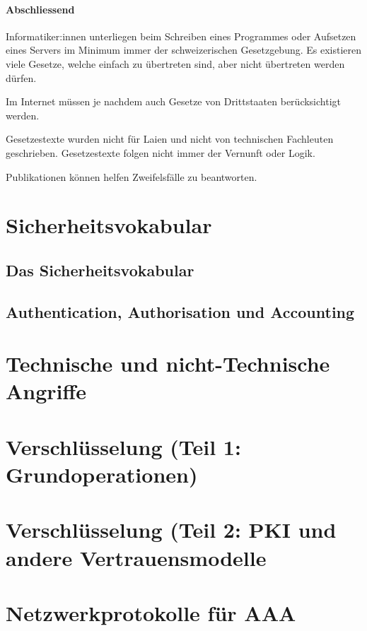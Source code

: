 \documentclass[a4paper,12pt]{article}
\begin{document}
\paragraph{Abschliessend} Informatiker:innen unterliegen beim Schreiben eines Programmes oder Aufsetzen eines Servers im Minimum immer der schweizerischen Gesetzgebung. Es existieren viele Gesetze, welche einfach zu übertreten sind, aber nicht übertreten werden dürfen.

Im Internet müssen je nachdem auch Gesetze von Drittstaaten berücksichtigt werden.

Gesetzestexte wurden nicht für Laien und nicht von technischen Fachleuten geschrieben. Gesetzestexte folgen nicht immer der Vernunft oder Logik.

Publikationen können helfen Zweifelsfälle zu beantworten.

\newpage
\section{Sicherheitsvokabular}

\subsection{Das Sicherheitsvokabular}

\subsection{Authentication, Authorisation und Accounting}

\newpage
\section{Technische und nicht-Technische Angriffe}

\newpage
\section{Verschlüsselung (Teil 1: Grundoperationen)}

\newpage
\section{Verschlüsselung (Teil 2: PKI und andere Vertrauensmodelle}

\newpage
\section{Netzwerkprotokolle für AAA}
\end{document}
